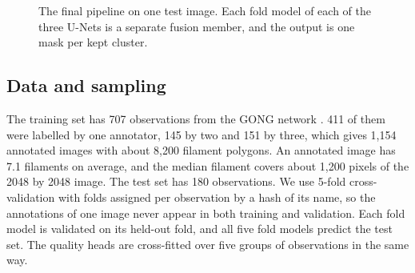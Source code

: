 \documentclass[sigconf]{acmart}
\begin{document}
\begin{figure}[t]
\centering
{}
\caption{The final pipeline on one test image. Each fold model of each of the three U-Nets is a separate fusion member, and the output is one mask per kept cluster.}
\label{fig:pipeline}
\end{figure}

\subsection{Data and sampling}

The training set has 707 observations from the GONG network \cite{harvey1996gong}. 411 of them were labelled by one annotator, 145 by two and 151 by three, which gives 1,154 annotated images with about 8,200 filament polygons. An annotated image has 7.1 filaments on average, and the median filament covers about 1,200 pixels of the 2048 by 2048 image. The test set has 180 observations. We use 5-fold cross-validation with folds assigned per observation by a hash of its name, so the annotations of one image never appear in both training and validation. Each fold model is validated on its held-out fold, and all five fold models predict the test set. The quality heads are cross-fitted over five groups of observations in the same way.
\end{document}

